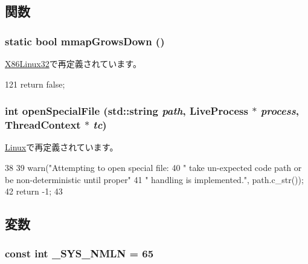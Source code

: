 \subsection{関数}
\hypertarget{classOperatingSystem_ac6a940551fe72dce1ba4e7b4fa093137}{
\subsubsection[{mmapGrowsDown}]{\setlength{\rightskip}{0pt plus 5cm}static bool mmapGrowsDown ()}}
\label{classOperatingSystem_ac6a940551fe72dce1ba4e7b4fa093137}


\hyperlink{classX86Linux32_ac6a940551fe72dce1ba4e7b4fa093137}{X86Linux32}で再定義されています。


\begin{DoxyCode}
121 { return false; }
\end{DoxyCode}
\hypertarget{classOperatingSystem_a4d991052a0ab25e074acd669d8570c30}{
\subsubsection[{openSpecialFile}]{\setlength{\rightskip}{0pt plus 5cm}int openSpecialFile (std::string {\em path}, \/  {\bf LiveProcess} $\ast$ {\em process}, \/  {\bf ThreadContext} $\ast$ {\em tc})}}
\label{classOperatingSystem_a4d991052a0ab25e074acd669d8570c30}


\hyperlink{classLinux_a4d991052a0ab25e074acd669d8570c30}{Linux}で再定義されています。


\begin{DoxyCode}
38 {
39     warn("Attempting to open special file: %
40             " take un-expected code path or be non-deterministic until proper"
41             "  handling is implemented.\n", path.c_str());
42     return -1;
43 }
\end{DoxyCode}


\subsection{変数}
\hypertarget{classOperatingSystem_a1a19d4c9718c9a4ad5fa2e48271fccc9}{
\subsubsection[{\_\-SYS\_\-NMLN}]{\setlength{\rightskip}{0pt plus 5cm}const int {\bf \_\-SYS\_\-NMLN} = 65}}
\label{classOperatingSystem_a1a19d4c9718c9a4ad5fa2e48271fccc9}


